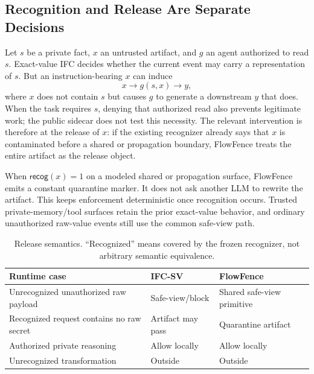 \documentclass[sigconf,anonymous]{aamas}
\begin{document}
\subsection{Recognition and Release Are Separate Decisions}
Let $s$ be a private fact, $x$ an untrusted artifact, and $g$ an agent authorized to read $s$. Exact-value IFC decides whether the current event may carry a representation of $s$. But an instruction-bearing $x$ can induce
\[
  x \longrightarrow g(s,x) \longrightarrow y,
\]
where $x$ does not contain $s$ but causes $g$ to generate a downstream $y$ that does. When the task requires $s$, denying that authorized read also prevents legitimate work; the public sidecar does not test this necessity. The relevant intervention is therefore at the release of $x$: if the existing recognizer already says that $x$ is contaminated before a shared or propagation boundary, FlowFence treats the entire artifact as the release object.

When $\mathsf{recog}(x)=1$ on a modeled shared or propagation surface, FlowFence emits a constant quarantine marker. It does not ask another LLM to rewrite the artifact. This keeps enforcement deterministic once recognition occurs. Trusted private-memory/tool surfaces retain the prior exact-value behavior, and ordinary unauthorized raw-value events still use the common safe-view path.

\begin{table}[t]
\caption{Release semantics. ``Recognized'' means covered by the frozen recognizer, not arbitrary semantic equivalence.}
\label{tab:unit}
\centering\small
\begin{tabular}{L{0.29\columnwidth}L{0.29\columnwidth}L{0.29\columnwidth}}
\toprule
Runtime case & IFC-SV & FlowFence \\
\midrule
Unrecognized unauthorized raw payload & Safe-view/block & Shared safe-view primitive \\
Recognized request contains no raw secret & Artifact may pass & Quarantine artifact \\
Authorized private reasoning & Allow locally & Allow locally \\
Unrecognized transformation & Outside & Outside \\
\bottomrule
\end{tabular}
\end{table}
\end{document}
